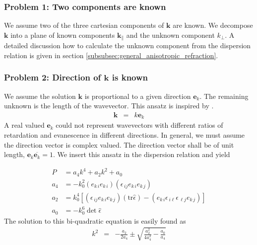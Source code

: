 \documentclass[12pt,a4paper,twoside,openright,BCOR10mm,headsepline,titlepage,abstracton,chapterprefix,final]{scrreprt}
\newcommand\Vector[1]{{\mathbf{#1}}}
\newcommand\wavenumber{k}
\newcommand\Wavevector{\Vector{\wavenumber}}
\newcommand\Tensor[1]{\hat{#1}}
\newcommand\scalarrelativepermittivity{\epsilon}
\newcommand\relativepermittivity{\Tensor{\scalarrelativepermittivity}}
\newcommand\tr{\text{tr}}
\begin{document}
\subsubsection{Problem 1: Two components are known}

We assume two of the three cartesian components of $\Wavevector$ are known.
We decompose $\Wavevector$ into a plane of known components $\Wavevector_\parallel$ and the unknown component $\wavenumber_\perp$. 
A detailed discussion how to calculate the unknown component from the dispersion relation
is given in section \ref{subsubsec:general_anisotropic_refraction}.

\subsubsection{Problem 2: Direction of $\Wavevector$ is known}
We assume the solution $\Wavevector$ is proportional to a given direction $\Vector{e}_\wavenumber$.
The remaining unknown is the length of the wavevector. This ansatz is inspired by \cite{Doering:1957, wiki:Kristalloptik}.
\begin{eqnarray}
 \Wavevector &=& \wavenumber \Vector{e}_\wavenumber
\end{eqnarray}
A real valued $\Vector{e}_\wavenumber$ could not represent wavevectors with different ratios of retardation and evanescence in different directions.
In general, we must assume the direction vector is complex valued.
The direction vector shall be of unit length, $\Vector{e}_\wavenumber \overline{\Vector{e}_\wavenumber} = 1$.
We insert this ansatz in the dispersion relation and yield

\begin{align}
 P &= a_4 \wavenumber^4 + a_2 \wavenumber^2 + a_0
 \\
 a_4 &= - k_0^2 (e_{k\,i} e_{k\,i}) (\scalarrelativepermittivity_{\,ij} e_{k\,i} e_{k\,j})
 \\
 a_2 &=   k_0^4 \left[ (\scalarrelativepermittivity_{\,ij} e_{k\,i} e_{k\,j}) (\tr\relativepermittivity) - (e_{k\,i} \scalarrelativepermittivity_{\,i\ell} \scalarrelativepermittivity_{\,\ell j} e_{k\,j}) \right]
 \\
 a_0 &= - k_0^6 \det \relativepermittivity
\end{align}
The solution to this bi-quadratic equation is easily found as
\begin{eqnarray}
 \wavenumber^2 &=& - \frac{a_2}{2 a_4} \pm \sqrt{\frac{a_2^2}{4 a_4^2} - \frac{a_0}{a_4}} 
\end{eqnarray}
\end{document}
